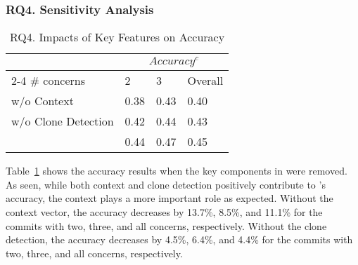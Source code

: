 \subsubsection{{\bf RQ4. Sensitivity Analysis}}


\begin{table}[t]
	\caption{RQ4. Impacts of Key Features on Accuracy}
	\vspace{-12pt}
	\begin{center}
		\footnotesize
		\tabcolsep 4pt
		\renewcommand{\arraystretch}{1} \begin{tabular}{p{3cm}<{\centering}|p{0.8cm}<{\centering}p{0.8cm}<{\centering}p{0.8cm}<{\centering}}
			
			\hline
			       \multirow{2}{*}{}                  & \multicolumn{3}{c}{$Accuracy^c$}\\
			                         \cline{2-4}
			    \# concerns                     & 2 & 3& Overall\\
			\hline

			\tool w/o Context        &  0.38 & 0.43  &   0.40        \\
			\tool w/o Clone Detection     &  0.42 & 0.44  &   0.43        \\
       			\tool                    &  0.44 & 0.47  &   0.45        \\
			\hline
		\end{tabular}
		\label{RQ4-result-1}
	\end{center}
\end{table}

Table~\ref{RQ4-result-1} shows the accuracy results when the key
components in {\tool} were removed. As seen, while both context and
clone detection positively contribute to {\tool}'s accuracy, the
context plays a more important role as expected. Without the context
vector, the accuracy decreases by 13.7\%, 8.5\%, and 11.1\% for the
commits with two, three, and all concerns, respectively. Without the
clone detection, the accuracy decreases by 4.5\%, 6.4\%, and 4.4\% for
the commits with two, three, and all concerns, respectively.



